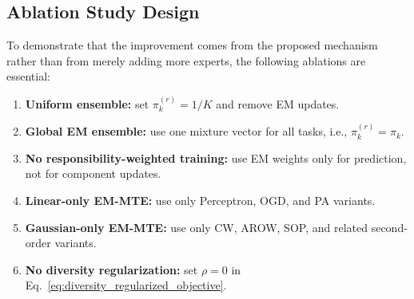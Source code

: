 ﻿\documentclass[12pt,a4paper]{article}
\begin{document}
\subsection{Ablation Study Design}
To demonstrate that the improvement comes from the proposed mechanism rather than from merely adding more experts, the following ablations are essential:
\begin{enumerate}
  \item \textbf{Uniform ensemble:} set $\pi_k^{(r)}=1/K$ and remove EM updates.
  \item \textbf{Global EM ensemble:} use one mixture vector for all tasks, i.e., $\pi_k^{(r)}=\pi_k$.
  \item \textbf{No responsibility-weighted training:} use EM weights only for prediction, not for component updates.
  \item \textbf{Linear-only EM-MTE:} use only Perceptron, OGD, and PA variants.
  \item \textbf{Gaussian-only EM-MTE:} use only CW, AROW, SOP, and related second-order variants.
  \item \textbf{No diversity regularization:} set $\rho=0$ in Eq.~\eqref{eq:diversity_regularized_objective}.
\end{enumerate}

\begin{table}[H]
\centering
\caption{Expected interpretation of ablation results.}
\label{tab:ablation_interpretation}
\renewcommand{\arraystretch}{1.25}
\end{table}
\end{document}
